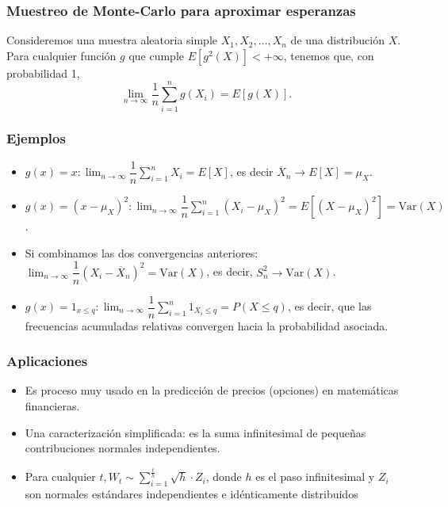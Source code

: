 \subsubsection{Muestreo de Monte-Carlo para aproximar esperanzas}
\begin{tcolorbox}[colback=blue!5!white, colframe=blue!75!black, title=\textbf{Ley de los grandes números}]
    Consideremos una muestra aleatoria simple $X_1,X_2,\dots,X_n$ de una distribución $X$. Para cualquier función  $g$ que cumple  $E[g^2(X)]<+\infty$, tenemos que, con probabilidad 1, \[
        \lim_{n \to \infty} \dfrac{1}{n}\sum_{i=1}^{n} g(X_i)=E[g(X)].
    \] 
\end{tcolorbox}
\subsubsection*{Ejemplos}
\begin{itemize}[label=\textbullet]
    \item $g(x)=x: \lim_{n \to \infty} \dfrac{1}{n}\sum_{i=1}^{n} X_i=E[X]$, es decir $\overline{X}_n\longrightarrow E[X]=\mu_X$.
    \item $g(x)=(x-\mu_X)^2: \lim_{n \to \infty} \dfrac{1}{n}\sum_{i=1}^{n} (X_i-\mu_X)^2=E[(X-\mu_X)^2]=\mathrm{Var}(X)$.
    \item Si combinamos las dos convergencias anteriores: $\lim_{n \to \infty} \dfrac{1}{n}(X_i-\overline{X}_n)^2=\mathrm{Var}(X)$, es decir, $S_n^2\longrightarrow \mathrm{Var}(X)$.
    \item $g(x)=1_{x\le q}: \lim_{n \to \infty} \dfrac{1}{n}\sum_{i=1}^{n} 1_{X_i\le q}=P(X\le q)$, es decir, que las frecuencias acumuladas relativas convergen hacia la probabilidad asociada.
\end{itemize}
\subsubsection*{Aplicaciones}
\begin{tcolorbox}[colback=blue!5!white, colframe=blue!75!black, title=\textbf{Ejemplo: el movimiento Browniano}]
    \begin{itemize}[label=\textbullet]
        \item Es proceso muy usado en la predicción de precios (opciones) en matemáticas financieras.
        \item Una caracterización simplificada: es la suma infinitesimal de pequeñas contribuciones normales independientes.
        \item Para cualquier $t,W_t\sim \sum_{i=1}^{\frac{t}{h} }\sqrt{h} \cdot Z_i $, donde $h$ es el paso infinitesimal y $Z_i$ son normales estándares independientes e idénticamente distribuidos 
    \end{itemize}
\end{tcolorbox}
